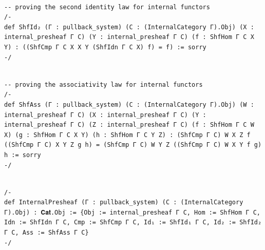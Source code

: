 \documentclass{book}
\theoremstyle{definition}
\newcounter{lcounter}
\begin{document}
\begin{center}
\begin{tcolorbox}[width=5in,colback={white},title={\begin{center}\texttt{Lean \thelcounter} \addtocounter{lcounter}{1}  \end{center}},colbacktitle=Blue,coltitle=black]
\begin{verbatim}

-- proving the second identity law for internal functors
/-
def ShfId₂ (Γ : pullback_system) (C : (InternalCategory Γ).Obj) (X : internal_presheaf Γ C) (Y : internal_presheaf Γ C) (f : ShfHom Γ C X Y) : ((ShfCmp Γ C X X Y (ShfIdn Γ C X) f) = f) := sorry
-/

\end{verbatim}
\end{tcolorbox}
\end{center}

\begin{center}
\begin{tcolorbox}[width=5in,colback={white},title={\begin{center}\texttt{Lean \thelcounter} \addtocounter{lcounter}{1}  \end{center}},colbacktitle=Blue,coltitle=black]
\begin{verbatim}

-- proving the associativity law for internal functors
/-
def ShfAss (Γ : pullback_system) (C : (InternalCategory Γ).Obj) (W : internal_presheaf Γ C) (X : internal_presheaf Γ C) (Y : internal_presheaf Γ C) (Z : internal_presheaf Γ C) (f : ShfHom Γ C W X) (g : ShfHom Γ C X Y) (h : ShfHom Γ C Y Z) : (ShfCmp Γ C) W X Z f ((ShfCmp Γ C) X Y Z g h) = (ShfCmp Γ C) W Y Z ((ShfCmp Γ C) W X Y f g) h := sorry
-/

\end{verbatim}
\end{tcolorbox}
\end{center}

\begin{center}
\begin{tcolorbox}[width=5in,colback={white},title={\begin{center}\texttt{Lean \thelcounter} \addtocounter{lcounter}{1}  \end{center}},colbacktitle=Blue,coltitle=black]
\begin{verbatim}

/-
def InternalPresheaf (Γ : pullback_system) (C : (InternalCategory Γ).Obj) : 𝐂𝐚𝐭.Obj := {Obj := internal_presheaf Γ C, Hom := ShfHom Γ C, Idn := ShfIdn Γ C, Cmp := ShfCmp Γ C, Id₁ := ShfId₁ Γ C, Id₂ := ShfId₂ Γ C, Ass := ShfAss Γ C}
-/

\end{verbatim}
\end{tcolorbox}
\end{center}
\end{document}
